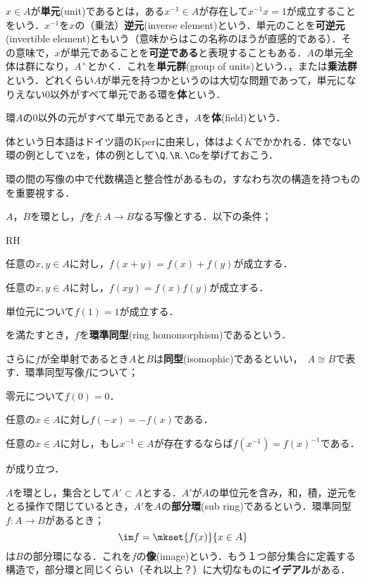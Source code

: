 $x\in A$が\textbf{単元}(unit)であるとは，ある$x^{-1}\in A$が存在して$x^{-1}x=1$が成立することをいう．$x^{-1}$を$x$の（乗法）\textbf{逆元}(inverse element)という．単元のことを\textbf{可逆元}(invertible element)ともいう（意味からはこの名称のほうが直感的である）．その意味で，$x$が単元であることを\textbf{可逆である}と表現することもある．$A$の単元全体は群になり，$A^\times$とかく．これを\textbf{単元群}(group of units)という．，または\textbf{乗法群}という．どれくらい$A$が単元を持つかというのは大切な問題であって，単元になりえない$0$以外がすべて単元である環を\textbf{体}という．

\begin{defi}[体]
	環$A$の0以外の元がすべて単元であるとき，$A$を\textbf{体}(field)という．
\end{defi}

体という日本語はドイツ語のKperに由来し，体はよく$K$でかかれる．体でない環の例として$\Z$を，体の例として$\Q,\R,\Co$を挙げておこう．

環の間の写像の中で代数構造と整合性があるもの，すなわち次の構造を持つものを重要視する．

\begin{defi}[環準同型]
	$A，B$を環とし，$f$を$f:A\to B$なる写像とする．以下の条件；
	\begin{defiterm}{RH}
		\item 任意の$x,y\in A$に対し，$f(x+y)=f(x)+f(y)$が成立する．
		\item 任意の$x,y\in A$に対し，$f(xy)=f(x)f(y)$が成立する．
		\item 単位元について$f(1)=1$が成立する．
	\end{defiterm}
	
	を満たすとき，$f$を\textbf{環準同型}(ring homomorphism)であるという．
\end{defi}

さらに$f$が全単射であるとき$A$と$B$は\textbf{同型}(isomophic)であるといい，~$A\cong B$で表す．環準同型写像$f$について；

\begin{sakura}
	\item 零元について$f(0)=0$．
	\item 任意の$x\in A$に対し$f(-x)=-f(x)$である．
	\item 任意の$x\in A$に対し，もし$x^{-1}\in A$が存在するならば$f(x^{-1})=f(x)^{-1}$である．
\end{sakura}
が成り立つ．

$A$を環とし，集合として$A'\subset A$とする．$A'$が$A$の単位元を含み，和，積，逆元をとる操作で閉じているとき，$A'$を$A$の\textbf{部分環}(sub ring)であるという．環準同型$f:A\to B$があるとき；
\[\im f=\mkset{f(x)}{x\in A}\]
は$B$の部分環になる．これを$f$の\textbf{像}(image)という．もう１つ部分集合に定義する構造で，部分環と同じくらい（それ以上？）に大切なものに\textbf{イデアル}がある．

